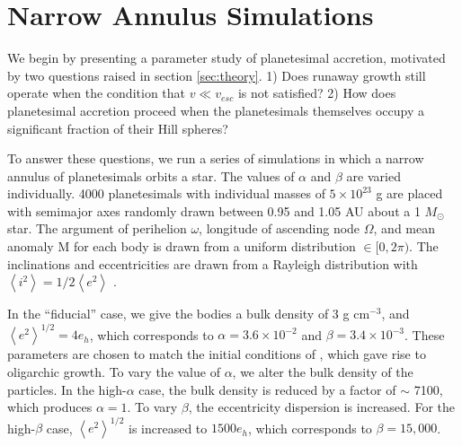\documentclass[twocolumn]{aastex63}
\begin{document}
\section{Narrow Annulus Simulations}\label{sec:narrow}

We begin by presenting a parameter study of planetesimal accretion,
motivated by two questions raised in section \ref{sec:theory}. 1) Does
runaway growth still operate when the condition that $v \ll v_{esc}$
is not satisfied? 2) How does planetesimal accretion proceed when the planetesimals themselves occupy a significant fraction of 
their Hill spheres?

To answer these questions, we run a series of simulations in which a
narrow annulus of planetesimals orbits a star. The values of $\alpha$
and $\beta$ are varied individually. 4000 planetesimals with
individual masses of $5 \times 10^{23}$ g are placed with semimajor
axes randomly drawn between 0.95 and 1.05 AU about a 1 $M_{\odot}$
star. The argument of perihelion $\omega$, longitude of ascending node
$\Omega$, and mean anomaly M for each body is drawn from a uniform
distribution $\in [0, 2 \pi)$. The inclinations and eccentricities are drawn
from a Rayleigh distribution with
$\left< i^{2} \right> = 1/2 \left< e^{2} \right>$ \citep{ida93a}.

In the ``fiducial'' case, we give the bodies a bulk density of 3 g
cm$^{-3}$, and $\left< e^{2} \right>^{1/2} = 4 e_{h}$, which corresponds to $\alpha = 3.6 \times 10^{-2}$ and $\beta = 3.4 \times 
10^{-3}$. These parameters are chosen to match the initial conditions of \citet{kokubo98}, which gave rise to oligarchic growth. 
To vary the value of $\alpha$, we alter the bulk density of the particles. In the high-$\alpha$ case, the bulk density is reduced by 
a factor of $\sim$ 7100, which produces $\alpha = 1$. To vary $\beta$, the eccentricity dispersion is increased. For the high-$
\beta$ case, $\left< e^{2} \right>^{1/2}$ is increased to $1500 e_{h}$, which corresponds to $\beta = 15,000$.
\end{document}
